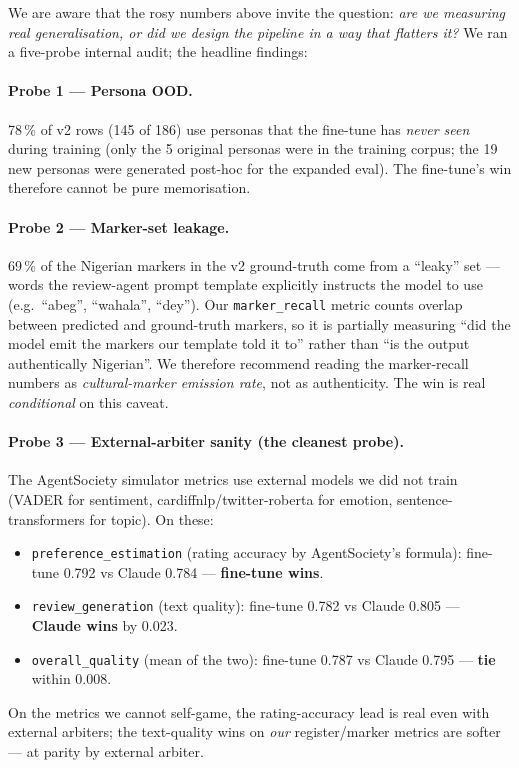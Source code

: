 \documentclass[sigconf,nonacm,balance]{acmart}
\begin{document}
We are aware that the rosy numbers above invite the question:
\emph{are we measuring real generalisation, or did we design the
pipeline in a way that flatters it?} We ran a five-probe internal
audit; the headline findings:

\paragraph{Probe 1 --- Persona OOD.} 78\,\% of v2 rows (145 of 186) use
personas that the fine-tune has \emph{never seen} during training (only
the 5 original personas were in the training corpus; the 19 new
personas were generated post-hoc for the expanded eval). The fine-tune's
win therefore cannot be pure memorisation.

\paragraph{Probe 2 --- Marker-set leakage.} 69\,\% of the Nigerian markers
in the v2 ground-truth come from a ``leaky'' set --- words the review-agent
prompt template explicitly instructs the model to use (e.g.\ ``abeg'',
``wahala'', ``dey''). Our \texttt{marker\_recall} metric counts overlap
between predicted and ground-truth markers, so it is partially measuring
``did the model emit the markers our template told it to'' rather than
``is the output authentically Nigerian''. We therefore recommend reading
the marker-recall numbers as \emph{cultural-marker emission rate}, not
as authenticity. The win is real \emph{conditional} on this caveat.

\paragraph{Probe 3 --- External-arbiter sanity (the cleanest probe).}
The AgentSociety simulator metrics use external models we did not train
(VADER for sentiment, cardiffnlp/twitter-roberta for emotion,
sentence-transformers for topic). On these:
\begin{itemize}[leftmargin=*]
    \item \texttt{preference\_estimation} (rating accuracy by AgentSociety's
          formula): fine-tune 0.792 vs Claude 0.784 --- \textbf{fine-tune wins}.
    \item \texttt{review\_generation} (text quality):
          fine-tune 0.782 vs Claude 0.805 --- \textbf{Claude wins} by 0.023.
    \item \texttt{overall\_quality} (mean of the two):
          fine-tune 0.787 vs Claude 0.795 --- \textbf{tie} within 0.008.
\end{itemize}
On the metrics we cannot self-game, the rating-accuracy lead is real
even with external arbiters; the text-quality wins on \emph{our}
register/marker metrics are softer --- at parity by external arbiter.
\end{document}
